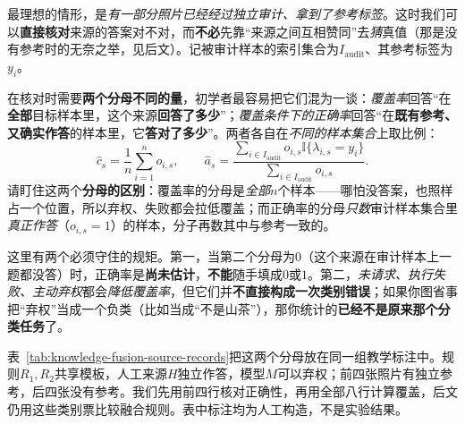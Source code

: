 最理想的情形，是\emph{有一部分照片已经经过独立审计、拿到了参考标签}。这时我们可以\textbf{直接核对}来源的答案对不对，而\textbf{不必}先靠“来源之间互相赞同”去\emph{猜}真值（那是没有参考时的无奈之举，见后文）。记被审计样本的索引集合为$I_{\mathrm{audit}}$、其参考标签为$y_i$。

在核对时需要\textbf{两个分母不同的量}，初学者最容易把它们混为一谈：\emph{覆盖率}回答“在\textbf{全部}目标样本里，这个来源\textbf{回答了多少}”；\emph{覆盖条件下的正确率}回答“在\textbf{既有参考、又确实作答}的样本里，它\textbf{答对了多少}”。两者各自在\emph{不同的样本集合}上取比例：
\begin{equation}
  \widehat c_s
  =\frac{1}{n}\sum_{i=1}^{n}o_{i,s},
  \qquad
  \widehat a_s
  =\frac{\sum_{i\in I_{\mathrm{audit}}}
    o_{i,s}\mathbb{I}\{\lambda_{i,s}=y_i\}}
  {\sum_{i\in I_{\mathrm{audit}}}o_{i,s}}.
  \label{eq:knowledge-fusion-audited-reliability}
\end{equation}
请盯住这两个\textbf{分母的区别}：覆盖率的分母是\emph{全部}$n$个样本——哪怕没答案，也照样占一个位置，所以弃权、失败都会拉低覆盖；而正确率的分母\emph{只数}审计样本集合里\emph{真正作答}（$o_{i,s}=1$）的样本，分子再数其中与参考一致的。

这里有两个必须守住的规矩。第一，当第二个分母为$0$（这个来源在审计样本上一题都没答）时，正确率是\textbf{尚未估计}，\textbf{不能}随手填成$0$或$1$。第二，\emph{未请求、执行失败、主动弃权}都会\emph{降低覆盖率}，但它们并\textbf{不直接构成一次类别错误}；如果你图省事把“弃权”当成一个负类（比如当成“不是山茶”），那你统计的\textbf{已经不是原来那个分类任务}了。

表~\ref{tab:knowledge-fusion-source-records}把这两个分母放在同一组教学标注中。规则$R_1,R_2$共享模板，人工来源$H$独立作答，模型$M$可以弃权；前四张照片有独立参考，后四张没有参考。我们先用前四行核对正确性，再用全部八行计算覆盖，后文仍用这些类别票比较融合规则。表中标注均为人工构造，不是实验结果。


